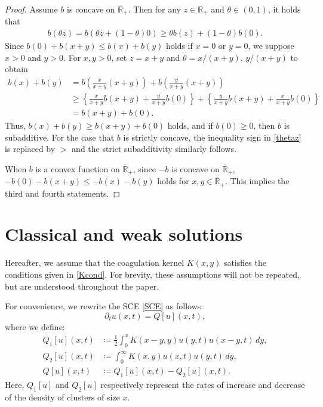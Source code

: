 \documentclass[a4paper,11pt]{article}
\def\Rp{{\mathbb R}_+}
\def\Rb{\overline{{\mathbb R}}_+}
\begin{document}
\begin{proof}
Assume $b$ is concave on $\Rb$. Then for any $z\in\Rp$ and $\theta\in (0,1)$, it holds that
\begin{align}\label{thetaz}
b(\theta z)=b(\theta z+(1-\theta) 0)\ge \theta b(z)+(1-\theta) b(0).
\end{align}
Since $b(0)+b(x+y)\le b(x)+b(y)$ holds if $x=0$ or $y=0$, we suppose
$x>0$ and $y>0$.
For $x,y>0$, set $z = x+y$ and $\theta = x/(x+y)$, $y/(x+y)$ to obtain
\begin{align*}
  b(x)+b(y)&=b\left(\frac{x}{x+y}(x+y)\right)+b\left(\frac{y}{x+y}(x+y)\right)\\
  &\geq \left\{\frac{x}{x+y}b(x+y)+\frac{y}{x+y}b(0)\right\}
  +\left\{\frac{y}{x+y}b(x+y)+\frac{x}{x+y}b(0)\right\}\\
    &=b(x+y)+b(0).
  \end{align*}
Thus, $b(x)+b(y)\ge b(x+y)+b(0)$ holds, and if $b(0)\ge 0$, then $b$ is subadditive.
For the case that $b$ is strictly concave, the inequality sign in \eqref{thetaz} is replaced by $>$
and the strict subadditivity similarly follows.

When $b$ is a convex function on $\Rb$, since $-b$ is concave on $\Rb$,
$-b(0)-b(x+y)\le -b(x)-b(y)$ holds for $x,y\in\Rb$. This implies the third and fourth statements.
\end{proof}

\section{Classical and weak solutions}\label{sec:3}
\setcounter{equation}{0}

Hereafter, we assume that the coagulation kernel $K(x,y)$ satisfies the conditions given in \eqref{Kcond}. For brevity, these assumptions will not be repeated, but are understood throughout the paper.

For convenience, we rewrite the SCE \eqref{SCE} as follows:
\[
\partial_t u(x,t) = Q[u](x,t),
\]
where we define:
\begin{align*}
  Q_1[u](x,t) &\coloneqq \frac{1}{2}\int_{0}^{x}K(x-y,y)u(y,t)u(x-y,t)\,dy,\\
  Q_2[u](x,t) &\coloneqq \int_{0}^{\infty}K(x,y)u(x,t)u(y,t)\,dy,\\
  Q[u](x,t) &\coloneqq Q_1[u](x,t)-Q_2[u](x,t).
\end{align*}
Here, $Q_1[u]$ and $Q_2[u]$ respectively represent the rates of increase and decrease of the density of clusters of size $x$.
\end{document}
